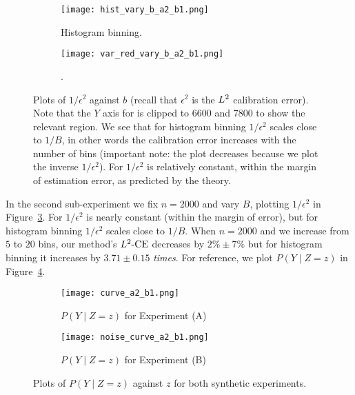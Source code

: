 \begin{figure}
  \centering
  \centering
     \begin{subfigure}[b]{0.48\textwidth}
         \centering
         \texttt{[image: hist\_vary\_b\_a2\_b1.png]}
         \caption{Histogram binning.
         }
         \label{fig:well-spec-vary-b-hist}
     \end{subfigure}
     \hfill
     \begin{subfigure}[b]{0.48\textwidth}
         \centering
         \texttt{[image: var\_red\_vary\_b\_a2\_b1.png]}
         \caption{\Ourcal{}.
         }
         \label{fig:well-spec-vary-b-var-red}
     \end{subfigure}
  \caption{
    Plots of $1/\epsilon^2$ against $b$ (recall that $\epsilon^2$ is the $L^2$ calibration error). Note that the $Y$ axis for \ourcal{} is clipped to 6600 and 7800 to show the relevant region. We see that for histogram binning $1/\epsilon^2$ scales close to $1/B$, in other words the calibration error increases with the number of bins (important note: the plot decreases because we plot the inverse $1/\epsilon^2$). For \ourcal{} $1/\epsilon^2$ is relatively constant, within the margin of estimation error, as predicted by the theory.
}
  \label{fig:well-spec-vary-b}
\end{figure}

In the second sub-experiment we fix $n = 2000$ and vary $B$, plotting $1/\epsilon^2$ in Figure~\ref{fig:well-spec-vary-b}. For \ourcal{} $1/\epsilon^2$ is nearly constant (within the margin of error), but for histogram binning $1/\epsilon^2$ scales close to $1/B$. When $n = 2000$ and we increase from $5$ to $20$ bins, our method's $L^2\textup{-CE}$ decreases by $2\% \pm 7\%$ but for histogram binning it increases by $3.71 \pm 0.15$ \emph{times}. For reference, we plot $P(Y \mid Z = z)$ in Figure~\ref{fig:well-spec-curve}.

\begin{figure}
  \centering
  \centering
     \begin{subfigure}[b]{0.48\textwidth}
         \centering
         \texttt{[image: curve\_a2\_b1.png]}
         \caption{$P(Y \mid Z=z)$ for Experiment (A)
         }
         \label{fig:well-spec-curve}
     \end{subfigure}
     \hfill
     \begin{subfigure}[b]{0.48\textwidth}
         \centering
         \texttt{[image: noise\_curve\_a2\_b1.png]}
         \caption{$P(Y \mid Z=z)$ for Experiment (B)
         }
         \label{fig:noisy-spec-curve}
     \end{subfigure}
  \caption{
    Plots of $P(Y \mid Z=z)$ against $z$ for both synthetic experiments.
}
  \label{fig:p_y_z_plots}
\end{figure}


